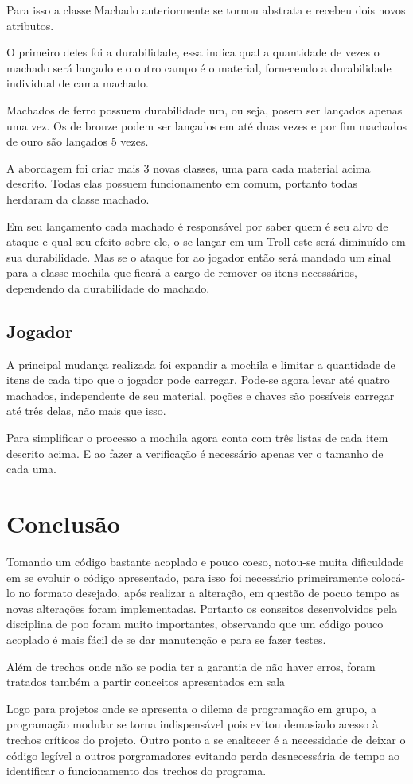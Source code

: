 \documentclass[runningheads,a4paper]{llncs}
\begin{document}
		Para isso a classe Machado anteriormente se tornou abstrata e recebeu dois novos atributos. 
		
		O primeiro deles foi a durabilidade, essa indica qual a quantidade de vezes o machado será lançado e o outro campo é o material, fornecendo a durabilidade individual de cama machado.
		
		Machados de ferro possuem durabilidade um, ou seja, posem ser lançados apenas uma vez. Os de bronze podem ser lançados em até duas vezes e por fim machados de ouro são lançados 5 vezes.
		
		A abordagem foi criar mais 3 novas classes, uma para cada material acima descrito. Todas elas possuem funcionamento em comum, portanto todas herdaram da classe machado.
		
		Em seu lançamento cada machado é responsável por saber quem é seu alvo de ataque e qual seu efeito sobre ele, o se lançar em um Troll este será diminuído em sua durabilidade. Mas se o ataque for ao jogador então será mandado um sinal para a classe mochila que ficará a cargo de remover os itens necessários, dependendo da durabilidade do machado.
		
	\subsection{Jogador}
		A principal mudança realizada foi expandir a mochila e limitar a quantidade de itens de cada tipo que o jogador pode carregar. Pode-se agora levar até quatro machados, independente de seu material, poções e chaves são possíveis carregar até três delas, não mais que isso. 
		
		Para simplificar o processo a mochila agora conta com três listas de cada item descrito acima. E ao fazer a verificação é necessário apenas ver o tamanho de cada uma. 

\section{Conclusão}
	Tomando um código bastante acoplado e pouco coeso, notou-se muita dificuldade em se evoluir o código apresentado, para isso foi necessário primeiramente colocá-lo no formato desejado, após realizar a alteração, em questão de pocuo tempo as novas alterações foram implementadas. Portanto os conseitos desenvolvidos pela disciplina de poo foram muito importantes, observando que um código pouco acoplado é mais fácil de se dar manutenção e para se fazer testes.
	
	Além de trechos onde não se podia ter a garantia de não haver erros, foram tratados também a partir conceitos apresentados em sala
	
	Logo para projetos onde se apresenta o dilema de programação em grupo, a programação modular se torna indispensável pois evitou demasiado acesso à trechos críticos do projeto. Outro ponto a se enaltecer é a necessidade de deixar o código legível a outros porgramadores evitando perda desnecessária de tempo ao identificar o funcionamento dos trechos do programa.



\nocite{*} 
\end{document}

